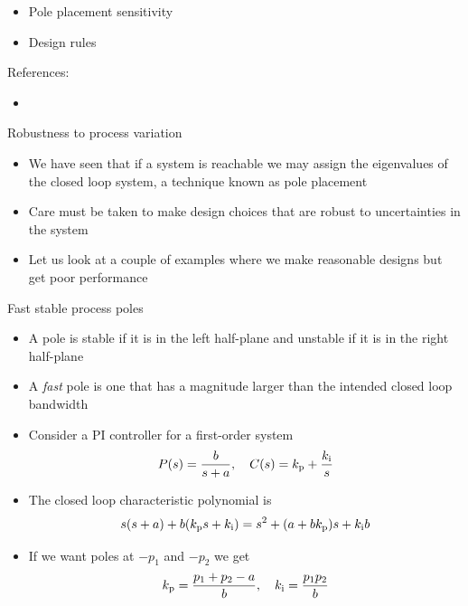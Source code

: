 \documentclass[10pt]{beamer-control}
\begin{document}

\begin{SUMMARY}
  \begin{itemize}
    \item Pole placement sensitivity
    \item Design rules
  \end{itemize}
  \vfill References:
  \begin{itemize}
    \item \astrom[§14.5]
  \end{itemize}
\end{SUMMARY}




\begin{frame}{Robustness to process variation}
  \begin{itemize}
    \item We have seen that if a system is reachable we may assign the eigenvalues of the closed loop system, a technique known as pole placement
    \item Care must be taken to make design choices that are robust to uncertainties in the system
    \item Let us look at a couple of examples where we make reasonable designs but get poor performance
  \end{itemize}
\end{frame}


\begin{frame}{Fast stable process poles}
  \begin{itemize}
    \item A pole is stable if it is in the left half-plane and unstable if it is in the right half-plane
    \item A \textit{fast} pole is one that has a magnitude larger than the intended closed loop bandwidth
    \item Consider a PI controller for a first-order system
      \begin{equation}
        P(s) = \frac{b}{s+a}, \quad C(s)=k_{\mathrm{p}}+\frac{k_{\mathrm{i}}}{s}
      \end{equation}
    \item The closed loop characteristic polynomial is
      \begin{equation}
        s(s+a)+b(k_{\mathrm{p}} s+k_{\mathrm{i}})=s^2+(a+bk_{\mathrm{p}})s+k_{\mathrm{i}} b
      \end{equation}
    \item If we want poles at $-p_1$ and $-p_2$ we get
      \begin{equation}
        k_{\mathrm{p}}=\frac{p_1+p_2-a}{b}, \quad k_{\mathrm{i}}=\frac{p_1p_2}{b}
      \end{equation}
  \end{itemize}
\end{frame}
\end{document}
